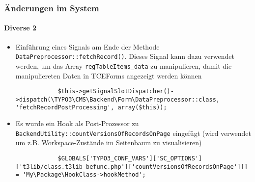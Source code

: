 \begin{frame}[fragile]
	\frametitle{Änderungen im System}
	\framesubtitle{Diverse 2}

	\lstset{
		basicstyle=\tiny\ttfamily
	}

	\begin{itemize}
		\item Einführung eines Signals am Ende der Methode \texttt{DataPreprocessor::fetchRecord()}. Dieses Signal kann dazu verwendet werden, um das Array \texttt{regTableItems\_data} zu manipulieren, damit die manipuliereten Daten in TCEForms angezeigt werden können 
		\begin{lstlisting}
			$this->getSignalSlotDispatcher()->dispatch(\TYPO3\CMS\Backend\Form\DataPreprocessor::class, 'fetchRecordPostProcessing', array($this));
		\end{lstlisting}
		\item Es wurde ein Hook als Post-Prozessor zu \texttt{BackendUtility::countVersionsOfRecordsOnPage} eingefügt (wird verwendet um z.B. Workspace-Zustände im Seitenbaum zu visualisieren)
		\begin{lstlisting} 
			$GLOBALS['TYPO3_CONF_VARS']['SC_OPTIONS']['t3lib/class.t3lib_befunc.php']['countVersionsOfRecordsOnPage'][] = 'My\Package\HookClass->hookMethod';
		\end{lstlisting}
	\end{itemize}

\end{frame}


